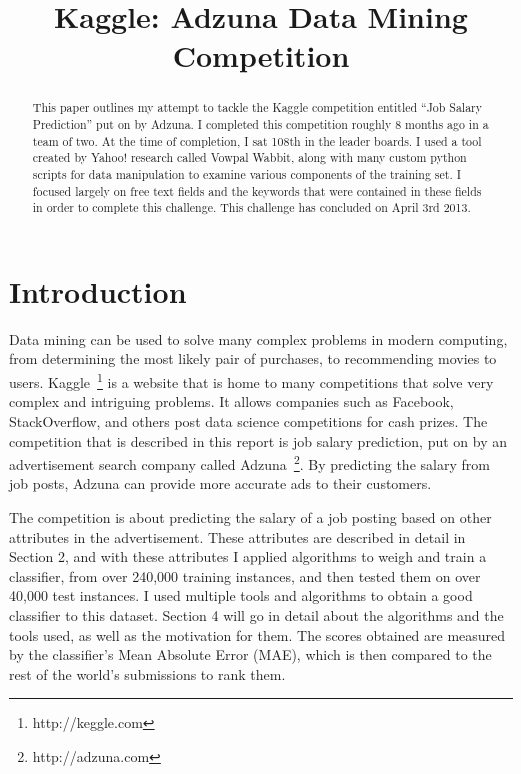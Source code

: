 \documentclass[conference]{IEEEtran}
\begin{document}
\title{Kaggle: Adzuna Data Mining Competition}

\author{
}

\maketitle


\begin{abstract}
This paper outlines my attempt to tackle the Kaggle competition entitled ``Job Salary Prediction''
put on by Adzuna. I completed this competition roughly 8 months ago in a team of two. At the time
of completion, I sat 108th in the leader boards. I used a tool created by Yahoo! research called Vowpal
Wabbit, along with many custom python scripts for data manipulation to examine various components
of the training set. I focused largely on free text fields and the keywords that were contained in 
these fields in order to complete this challenge. This challenge has concluded on April 3rd 2013.

\end{abstract}


\section{Introduction}

Data mining can be used to solve many complex problems in modern computing, from determining the most
likely pair of purchases, to recommending movies to users.
Kaggle~\footnote{http://keggle.com}
is a website that is home to many competitions that solve very complex and intriguing problems. It allows companies 
such as Facebook, StackOverﬂow, and others post data science competitions for cash prizes. The competition that is 
described in this report is job salary prediction, put on by an advertisement search company called 
Adzuna~\footnote{http://adzuna.com}. By predicting the
salary from job posts, Adzuna can provide more accurate ads to their customers. 

The competition is about predicting the 
salary of a job posting based on other attributes in the advertisement. These attributes are described in detail in Section 2, 
and with these attributes I applied algorithms to weigh and train a classifier, from over 240,000 training instances, 
and then tested them on over 40,000 test instances. I used multiple tools and algorithms to obtain a good classifier to this dataset. 
Section 4 will go in detail about the algorithms and the tools used, as well as the motivation for them. The scores obtained are 
measured by the classifier's Mean Absolute Error (MAE), which is then compared to the rest of the world’s submissions to rank them.
\end{document}
